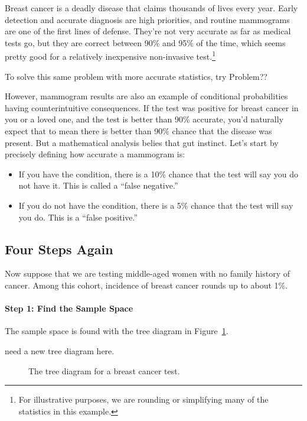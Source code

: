 Breast cancer is a deadly disease that claims thousands of lives every
year.  Early detection and accurate diagnosis are high priorities, and
routine mammograms are one of the first lines of defense.  They're not
very accurate as far as medical tests go, but they are correct between
90\% and 95\% of the time, which seems pretty good for a relatively
inexpensive non-invasive test.\footnote{For illustrative purposes, we
  are rounding or simplifying many of the statistics in this example.}
\begin{editingnotes}
  To solve this same problem
  with more accurate statistics, try Problem??
\end{editingnotes}
However, mammogram results are also an example of conditional
probabilities having counterintuitive consequences.  If the test was
positive for breast cancer in you or a loved one, and the test is
better than 90\% accurate, you'd naturally expect that to mean there
is better than 90\% chance that the disease was present. But a
mathematical analysis belies that gut instinct.  Let's start by
precisely defining how accurate a mammogram is:
\begin{itemize}

\item If you have the condition, there is a 10\% chance that the test
  will say you do not have it.  This is called a ``false negative.''

\item If you do not have the condition, there is a 5\% chance that the
  test will say you do.  This is a ``false positive.''

\end{itemize}

\subsection{Four Steps Again}

Now suppose that we are testing middle-aged women with no family
history of cancer.  Among this cohort, incidence of breast cancer
rounds up to about 1\%.

\paragraph{Step 1: Find the Sample Space}

The sample space is found with the tree diagram in
Figure~\ref{fig:15C1}.
\begin{editingnotes}
need a new tree diagram here.
\end{editingnotes}
\begin{figure}[h]


\caption{The tree diagram for a breast cancer test.}

\label{fig:15C1}

\end{figure}

